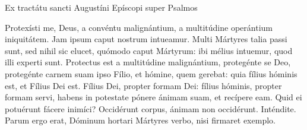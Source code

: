 
Ex tractátu sancti Augustíni Epíscopi super Psalmos

Protexísti me, Deus, a convéntu malignántium, a multitúdine operántium iniquitátem. Jam ipsum caput nostrum intueamur. Multi Mártyres talia passi sunt, sed nihil sic elucet, quómodo caput Mártyrum: ibi mélius intuemur, quod illi experti sunt. Protectus est a multitúdine malignántium, protegénte se Deo, protegénte carnem suam ipso Fílio, et hómine, quem gerebat: quia fílius hóminis est, et Fílius Dei est. Fílius Dei, propter formam Dei: fílius hóminis, propter formam servi, habens in potestate pónere ánimam suam, et recípere eam. Quid ei potuérunt fácere inimíci? Occidérunt corpus, ánimam non occidérunt. Inténdite. Parum ergo erat, Dóminum hortari Mártyres verbo, nisi firmaret exemplo.
\par